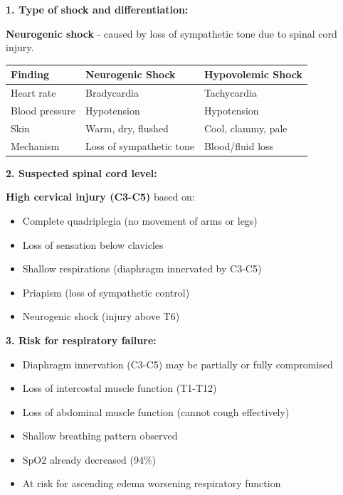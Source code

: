 \documentclass[11pt]{article}
\begin{document}
\begin{tcolorbox}[colback=green!5!white,colframe=green!75!black,title=Case Study 2 - Answers]

\textbf{1. Type of shock and differentiation:}

\textbf{Neurogenic shock} - caused by loss of sympathetic tone due to spinal cord injury.

\begin{center}
\begin{tabular}{|l|l|l|}
\hline
\textbf{Finding} & \textbf{Neurogenic Shock} & \textbf{Hypovolemic Shock} \\
\hline
Heart rate & Bradycardia & Tachycardia \\
Blood pressure & Hypotension & Hypotension \\
Skin & Warm, dry, flushed & Cool, clammy, pale \\
Mechanism & Loss of sympathetic tone & Blood/fluid loss \\
\hline
\end{tabular}
\end{center}

\textbf{2. Suspected spinal cord level:}

\textbf{High cervical injury (C3-C5)} based on:
\begin{itemize}
    \item Complete quadriplegia (no movement of arms or legs)
    \item Loss of sensation below clavicles
    \item Shallow respirations (diaphragm innervated by C3-C5)
    \item Priapism (loss of sympathetic control)
    \item Neurogenic shock (injury above T6)
\end{itemize}

\textbf{3. Risk for respiratory failure:}

\begin{itemize}
    \item Diaphragm innervation (C3-C5) may be partially or fully compromised
    \item Loss of intercostal muscle function (T1-T12)
    \item Loss of abdominal muscle function (cannot cough effectively)
    \item Shallow breathing pattern observed
    \item SpO2 already decreased (94\%)
    \item At risk for ascending edema worsening respiratory function
\end{itemize}


\end{tcolorbox}
\end{document}
